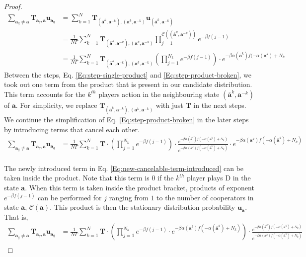\documentclass[11pt]{article}
\theoremstyle{plainCl1}
\theoremstyle{plainCl2}
\newcommand{\abf}{\mathbf{a}}
\newcommand{\T}{\mathbf{T}}
\newcommand{\ubf}{\mathbf{u}}
\newcommand{\D}{\mathrm{D}}
\begin{document}
\begin{proof}
\begin{align}
\sum_{\abf_q \neq \abf} \T_{\abf_q, \abf} \ubf_{\abf_q} &= \sum_{k=1}^N \T_{(\bar{\abf}^k, \abf^{-k}),(\abf^k, \abf^{-k})} \ubf_{(\bar{\abf}^k, \abf^{-k})} \\[10pt]
\label{Eq:step-single-product}
&= \frac{1}{N \Gamma} \sum_{k=1}^N \T_{(\bar{\abf}^k, \abf^{-k}),(\abf^k, \abf^{-k})} \displaystyle \prod_{j=1}^{\mathcal{C}((\bar{\abf}^k, \abf^{-k}))} e^{-\beta f(j-1)}\\[10pt]
&=  \frac{1}{N \Gamma} \sum_{k=1}^N \T_{(\bar{\abf}^k, \abf^{-k}),(\abf^k, \abf^{-k})} \displaystyle \left( \prod_{j=1}^{N_k}  e^{-\beta f(j-1)} \right) \cdot e^{-\beta \alpha(\bar{\abf}^k)f(-\alpha(\abf^k)+ N_k}
\label{Eq:step-product-broken}
\end{align}
Between the steps, Eq. \ref{Eq:step-single-product} and \ref{Eq:step-product-broken}, we took out one term from the product that is present in our candidate distribution. This term accounts for the $k^{th}$ players action in the neighbouring state $(\bar{\abf}^k, \abf^{-k})$ of $\abf$. For simplicity, we replace $\T_{(\bar{\abf}^k, \abf^{-k}),(\abf^k, \abf^{-k})}$ with just $\T$ in the next steps. We continue the simplification of Eq. \ref{Eq:step-product-broken} in the later steps by introducing terms that cancel each other. \\[10pt]
\begin{align}
\sum_{\abf_q \neq \abf} \T_{\abf_q, \abf} \ubf_{\abf_q} &=  \frac{1}{N \Gamma} \sum_{k=1}^N \T \cdot \displaystyle \left( \prod_{j=1}^{N_k}  e^{-\beta f(j-1)} \right) \cdot \frac{e^{-\beta \alpha(\bar{\abf}^k)f(-\alpha(\abf^k)+ N_k)}}{e^{-\beta \alpha(\abf^k)f(-\alpha(\bar{\abf}^k) +N_k)}} \cdot e^{-\beta \alpha(\abf^k)f(-\alpha(\bar{\abf}^k) + N_k)}
\label{Eq:new-cancelable-term-introduced}
\end{align}
\\ \noindent The newly introduced term in Eq. \ref{Eq:new-cancelable-term-introduced} can be taken inside the product. Note that this term is 0 if the $k^{th}$ player plays $\D$ in the state $\abf$. When this term is taken inside the product bracket, products of exponent $e^{-\beta f(j-1)}$ can be performed for $j$ ranging from $1$ to the number of cooperators in state $\abf$, $\mathcal{C}(\abf)$. This product is then the stationary distribution probability $\ubf_\abf$. That is, 
\begin{align}
\sum_{\abf_q \neq \abf} \T_{\abf_q, \abf} \ubf_{\abf_q} &=  \frac{1}{N \Gamma} \sum_{k=1}^N \T \cdot \displaystyle \left( \prod_{j=1}^{N_k}  e^{-\beta f(j-1)} \cdot e^{-\beta \alpha(\abf^k)f(-\alpha(\bar{\abf}^k) + N_k)} \right) \cdot \frac{e^{-\beta \alpha(\bar{\abf}^k)f(-\alpha(\abf^k)+ N_k)}}{e^{-\beta \alpha(\abf^k)f(-\alpha(\bar{\abf}^k) +N_k)}} \\[10pt]

\end{align}
\end{proof}
\end{document}
